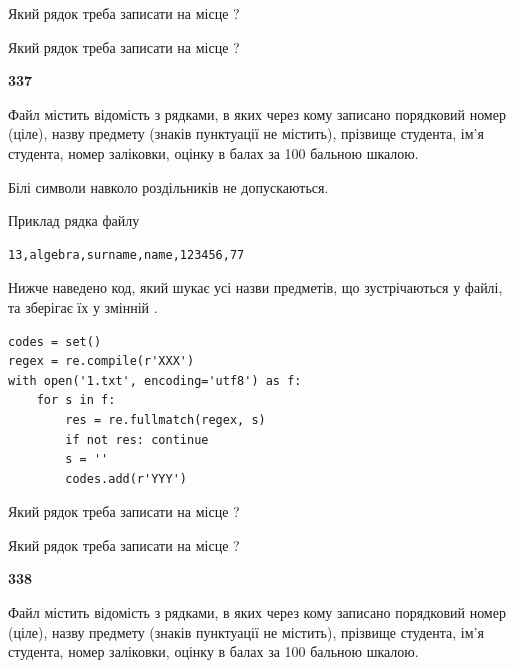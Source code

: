 Який рядок треба записати на місце  ?\par
\vspace{5mm}


Який рядок треба записати на місце  ?\par


\newpage

{\begin {center}\textbf{ 337}\end {center}}\par
Файл  містить відомість з рядками, в яких через кому записано поряд\-ковий номер (ціле), назву предмету (знаків пунктуації не містить), прізвище студента, ім'я студента, номер заліковки, оцінку в балах за 100 бальною шкалою.

Білі символи навколо роздільників не допускаються.

Приклад рядка файлу



\begin{verbatim}
13,algebra,surname,name,123456,77
\end{verbatim}


Нижче наведено код, який шукає усі назви предметів, що зустрічаються у файлі, та зберігає їх у змінній .



\begin{verbatim}
codes = set()
regex = re.compile(r'XXX')
with open('1.txt', encoding='utf8') as f:
    for s in f:
        res = re.fullmatch(regex, s)
        if not res: continue
        s = ''
        codes.add(r'YYY')
\end{verbatim}





Який рядок треба записати на місце  ?\par
\vspace{5mm}


Який рядок треба записати на місце  ?\par


\newpage

{\begin {center}\textbf{ 338}\end {center}}\par
Файл  містить відомість з рядками, в яких через кому записано поряд\-ковий номер (ціле), назву предмету (знаків пунктуації не містить), прізвище студента, ім'я студента, номер заліковки, оцінку в балах за 100 бальною шкалою.

